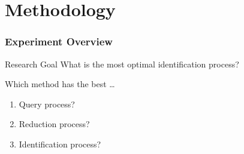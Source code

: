 \documentclass[11pt]{beamer}
\begin{document}
    \section{Methodology}\label{sec:methodology}
    \begin{frame}
        \frametitle{Experiment Overview}
        \begin{block}{Research Goal}
            What is the most optimal identification process?
        \end{block} \bigskip \bigskip
        Which method has the best \ldots
        \begin{enumerate}
            \item Query process? \medskip
            \item Reduction process? \medskip
            \item Identification process? \medskip
        \end{enumerate}
    \end{frame}
\end{document}
